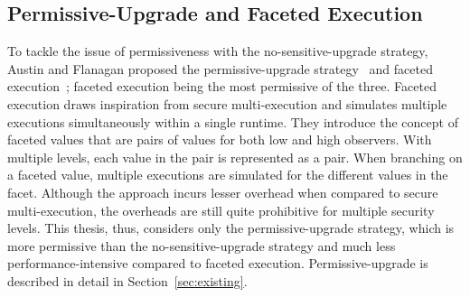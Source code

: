 \subsection{Permissive-Upgrade and Faceted Execution}
To tackle the issue of permissiveness with the no-sensitive-upgrade
strategy, Austin and Flanagan proposed 
the permissive-upgrade strategy~\cite{plas10} and faceted
execution~\cite{austin12POPL}; faceted execution being the most
permissive of the three. Faceted execution draws inspiration from
secure multi-execution and simulates multiple executions
simultaneously within a single runtime. They introduce the concept of
faceted values that are pairs of values for both low and high
observers. With multiple levels, each value in the pair is represented
as a pair. When branching on a faceted value, multiple executions are
simulated for the different values in the facet. Although the approach
incurs lesser overhead when compared to secure multi-execution, the
overheads are still quite prohibitive for multiple security
levels. This thesis, thus, considers only the permissive-upgrade
strategy, which is more permissive than the no-sensitive-upgrade
strategy and much less performance-intensive compared to faceted
execution. Permissive-upgrade is described in detail in
Section~\ref{sec:existing}. 

